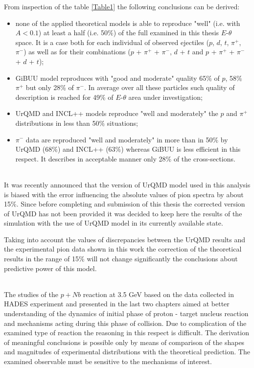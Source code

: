 From inspection of the table \ref{Table1} the following conclusions
can be derived:
\begin{itemize}
    \item none of the applied theoretical models is able to reproduce "well" (i.e. with $A < 0.1$) at least a half (i.e. 50$\%$) of the full examined in this thesis $E$-$\theta$ space. It is a case both for each individual of observed ejectiles ($p$, $d$, $t$, $\pi^+$, $\pi^-$) as well as for their combinations ($p$ + $\pi^{+}$ + $\pi^{-}$, $d$ + $t$ and  $p$ + $\pi^{+}$ + $\pi^{-}$ + $d$ + $t$);
    \item GiBUU model reproduces with "good and moderate" 
    quality 65\% of $p$, 58\% $\pi^{+}$ but only 28\% of $\pi^{-}$. 
    In average over all these particles such quality of description is reached for 49\% of $E$-$\theta$ area under investigation;
    \item UrQMD and INCL++ models reproduce "well and moderately" 
    the $p$ and $\pi^{+}$ distributions in less than 50$\%$ situations;
    \item $\pi^{-}$ data are reproduced "well and moderately" in more than in 50$\%$ by UrQMD (68\%) and INCL++ (63\%) whereas GiBUU is less efficient in this respect. It describes in acceptable manner only 28\% of the cross-sections.
\end{itemize}

 \ \\
 
 It was recently announced \cite{Private_comunication} that 
 the version of UrQMD model used in this analysis is biased with the error influencing the absolute values of pion spectra by about 15\%.
 Since before completing and submission of this thesis the corrected version of UrQMD has not been provided it was decided to keep here the results of the simulation with the use 
 of UrQMD model in its currently available state. 
 
 Taking into account the values of discrepancies between the UrQMD 
 results and the experimental pion data shown in this work 
 the correction of the theoretical results in the range of 15\% will not change significantly the conclusions about predictive power of this model.

 \ \\

The studies of the $p+Nb$ reaction at 3.5 GeV 
based on the data collected in HADES experiment 
and presented in the last two chapters aimed at better understanding of the dynamics of initial phase of proton - target nucleus reaction and mechanisms acting during this phase of collision. 
Due to complication of the examined type of reaction the reasoning in this respect is difficult. The derivation of meaningful conclusions is possible only by means of comparison of the shapes and magnitudes of experimental distributions with the theoretical prediction. The examined observable must be sensitive to the mechanisms of interest. 

